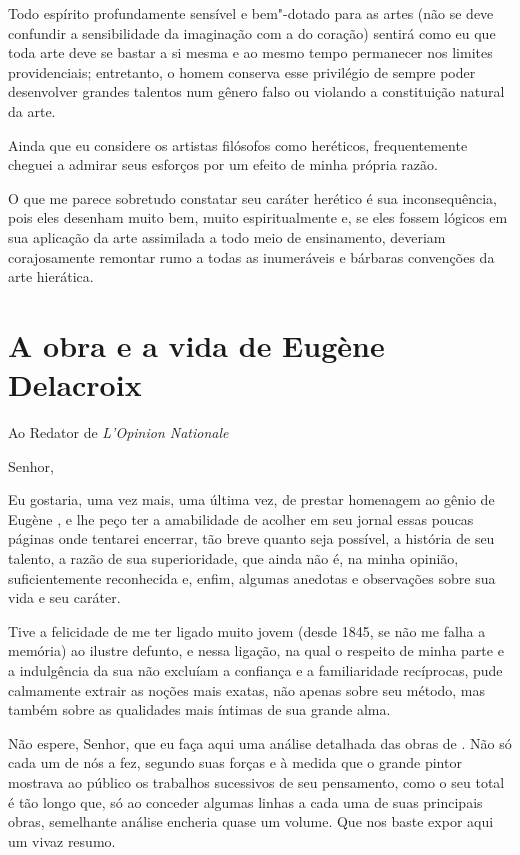 Todo espírito profundamente sensível e bem"-dotado para as artes (não se
deve confundir a sensibilidade da imaginação com a do coração) sentirá
como eu que toda arte deve se bastar a si mesma e ao mesmo tempo
permanecer nos limites providenciais; entretanto, o homem conserva esse
privilégio de sempre poder desenvolver grandes talentos num gênero
falso ou violando a constituição natural da arte.

Ainda que eu considere os artistas filósofos como heréticos,
frequentemente cheguei a admirar seus esforços por um efeito de minha
própria razão.

O que me parece sobretudo constatar seu caráter herético é sua
inconsequência, pois eles desenham muito bem, muito espiritualmente e,
se eles fossem lógicos em sua aplicação da arte assimilada a todo meio
de ensinamento, deveriam corajosamente remontar rumo a todas as
inumeráveis e bárbaras convenções da arte hierática.

\chapter{A obra e a vida de Eugène Delacroix}

Ao Redator de \textit{L'Opinion Nationale}

\vspace{1em}
Senhor,

Eu gostaria, uma vez mais, uma última vez, de prestar homenagem ao gênio
de Eugène , e lhe peço ter a amabilidade de acolher em seu
jornal essas poucas páginas onde tentarei encerrar, tão breve quanto
seja possível, a história de seu talento, a razão de sua superioridade,
que ainda não é, na minha opinião, suficientemente reconhecida e,
enfim, algumas anedotas e observações sobre sua vida e seu caráter.

Tive a felicidade de me ter ligado muito jovem (desde 1845, se não me
falha a memória) ao ilustre defunto, e nessa ligação, na qual o
respeito de minha parte e a indulgência da sua não excluíam a confiança
e a familiaridade recíprocas, pude calmamente extrair as noções mais
exatas, não apenas sobre seu método, mas também sobre as qualidades
mais íntimas de sua grande alma.

Não espere, Senhor, que eu faça aqui uma análise detalhada das obras de
. Não só cada um de nós a fez, segundo suas forças e à medida
que o grande pintor mostrava ao público os trabalhos sucessivos de seu
pensamento, como o seu total é tão longo que, só ao conceder algumas
linhas a cada uma de suas principais obras, semelhante análise encheria
quase um volume. Que nos baste expor aqui um vivaz resumo.

